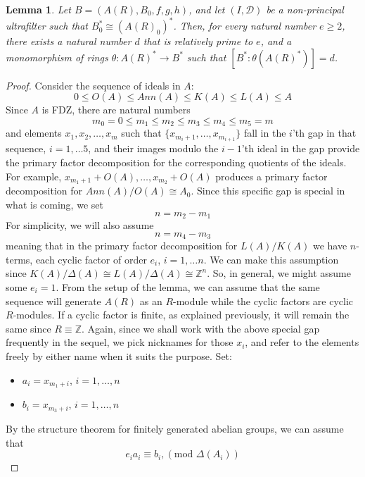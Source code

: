 \documentclass{article}
\newtheorem{lemma}[theorem]{Lemma}
\theoremstyle{remark}
\def\Z{{\mathbb{Z}}}
\def\D{{\mathcal{D}}}
\begin{document}
  
\begin{lemma}\label{lem:mono} Let $B=(A(R),B_0,f,g,h)$, and let $(I,\D)$ be a non-principal ultrafilter such that $B_0^*\cong (A(R)_0)^*$. Then, for every natural number $e\geq 2$, there exists a natural number $d$ that is relatively prime to $e$, and a monomorphism of rings $\theta: A(R)^*\to B^*$ such that $[B^*:\theta(A(R)^*)]=d$.\end{lemma}
\begin{proof} 
Consider the sequence of ideals in $A$: $$0\leq O(A) \leq Ann(A) \leq K(A) \leq L(A) \leq A$$
Since $A$ is FDZ, there are natural numbers $$m_0=0\leq m_1 \leq m_2 \leq m_3\leq m_4 \leq m_5=m$$ and elements $x_1,x_2, \ldots, x_m$ such that $\{x_{m_i+1}, \ldots, x_{m_{i+1}}\}$ fall in the $i$'th gap in that sequence, $i=1,\ldots 5$, and their images modulo the $i-1$'th ideal in the gap provide the primary factor decomposition for the corresponding quotients of the ideals. For example, $x_{m_1+1}+O(A), \ldots , x_{m_2}+O(A)$ produces a primary factor decomposition for $Ann(A)/O(A)\cong A_0$. Since this specific gap is special in what is coming, we set
$$n=m_2-m_1$$
For simplicity, we will also assume 
$$n=m_4-m_3$$
meaning that in the primary factor decomposition for $L(A)/K(A)$ we have $n$-terms, each cyclic factor of order $e_i$, $i=1,\ldots n$. We can make this assumption since $K(A)/\Delta(A) \cong L(A)/\Delta(A)\cong \Z^n$. So, in general, we  might assume some $e_i=1$. From the setup of the lemma, we can assume that the same sequence will generate $A(R)$ as an $R$-module while the cyclic factors are cyclic $R$-modules. If a cyclic factor is finite, as explained previously, it will remain the same since $R\equiv \Z$. Again, since we shall work with the above special gap frequently in the sequel, we pick nicknames for those $x_i$, and refer to the elements freely by either name when it suits the purpose. Set:
\begin{itemize}
    \item $a_i= x_{m_1+i}$, $i=1,\ldots ,n$
    \item $b_i=x_{m_3+i}$, $i=1, \ldots, n$
\end{itemize}
By the structure theorem for finitely generated abelian groups, we can assume that
$$e_ia_i \equiv  b_i, (\text{mod~} \Delta(A_i))$$


\end{proof}
\end{document}
